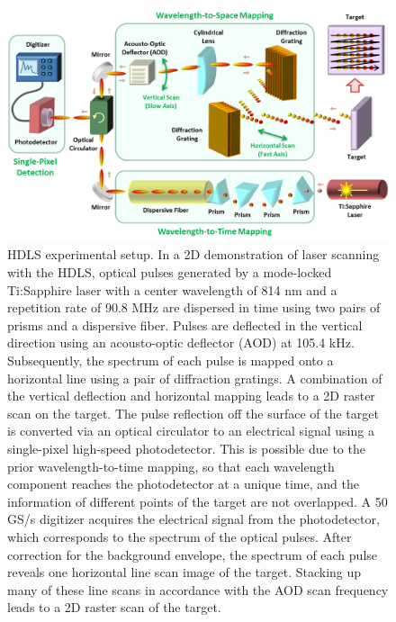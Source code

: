 \begin{figure}[htb!]
\centering
\includegraphics[scale=1]{PW2013/Figure2.png}
\caption{HDLS experimental setup. In a 2D demonstration of laser scanning with the HDLS, optical pulses generated by a mode-locked Ti:Sapphire laser with a center wavelength of 814 nm and a repetition rate of 90.8 MHz are dispersed in time using two pairs of prisms and a dispersive fiber. Pulses are deflected in the vertical direction using an acousto-optic deflector (AOD) at 105.4 kHz. Subsequently, the spectrum of each pulse is mapped onto a horizontal line using a pair of diffraction gratings. A combination of the vertical deflection and horizontal mapping leads to a 2D raster scan on the target. The pulse reflection off the surface of the target is converted via an optical circulator to an electrical signal using a single-pixel high-speed photodetector. This is possible due to the prior wavelength-to-time mapping, so that each wavelength component reaches the photodetector at a unique time, and the information of different points of the target are not overlapped. A 50 GS/s digitizer acquires the electrical signal from the photodetector, which corresponds to the spectrum of the optical pulses. After correction for the background envelope, the spectrum of each pulse reveals one horizontal line scan image of the target. Stacking up many of these line scans in accordance with the AOD scan frequency leads to a 2D raster scan of the target.}
\label{fig:PW2013_Figure2}
\end{figure}


